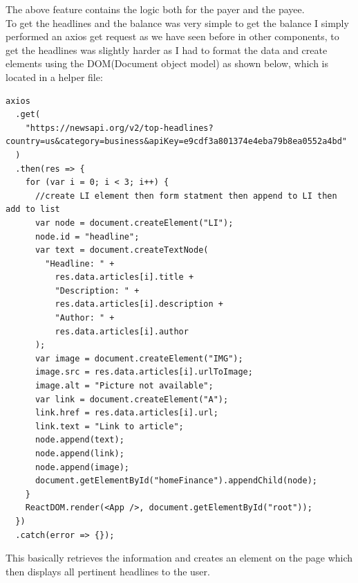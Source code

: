 The above feature contains the logic both for the payer and the payee.
\\
To get the headlines and the balance was very simple to get the balance I simply performed an axios get request as we have seen before in other components, to get the headlines was slightly harder as I had to format the data and create elements using the DOM(Document object model) as shown below, which is located in a helper file:
\begin{verbatim}
axios
  .get(
    "https://newsapi.org/v2/top-headlines?country=us&category=business&apiKey=e9cdf3a801374e4eba79b8ea0552a4bd"
  )
  .then(res => {
    for (var i = 0; i < 3; i++) {
      //create LI element then form statment then append to LI then add to list
      var node = document.createElement("LI");
      node.id = "headline";
      var text = document.createTextNode(
        "Headline: " +
          res.data.articles[i].title +
          "Description: " +
          res.data.articles[i].description +
          "Author: " +
          res.data.articles[i].author
      );
      var image = document.createElement("IMG");
      image.src = res.data.articles[i].urlToImage;
      image.alt = "Picture not available";
      var link = document.createElement("A");
      link.href = res.data.articles[i].url;
      link.text = "Link to article";
      node.append(text);
      node.append(link);
      node.append(image);
      document.getElementById("homeFinance").appendChild(node);
    }
    ReactDOM.render(<App />, document.getElementById("root"));
  })
  .catch(error => {});
\end{verbatim}
This basically retrieves the information and creates an element on the page which then displays all pertinent headlines to the user.
